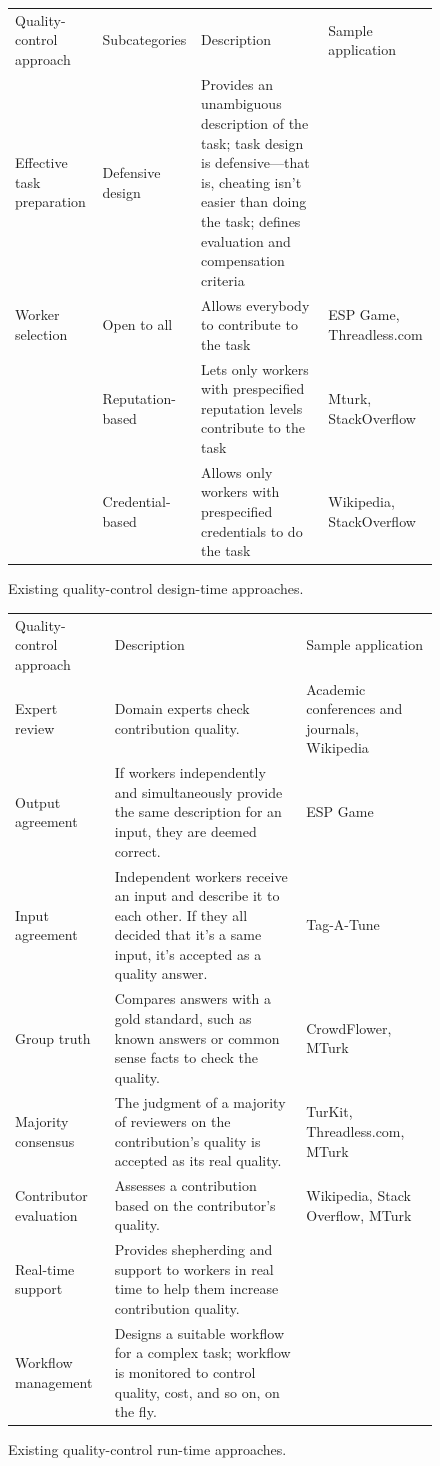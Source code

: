 \documentclass{sig-alternate-05-2015}
\begin{document}
	
	\begin{figure}
	\begin{tabularx}{\textwidth}{|XlXl|}
		\hline
		Quality-control approach & Subcategories & Description & Sample application\\
		Effective task preparation & Defensive design & Provides an unambiguous description of the task; task design is defensive---that is, cheating isn't easier than doing the task; defines evaluation and compensation criteria &  \\
		Worker selection & Open to all & Allows everybody to contribute to the task & ESP Game, Threadless.com \\
										  & Reputation-based & Lets only workers with prespecified reputation levels contribute to the task & Mturk, StackOverflow \\
										  & Credential-based & Allows only workers with prespecified credentials to do the task & Wikipedia, StackOverflow \\ \hline
	\end{tabularx}
	\caption{Existing quality-control design-time approaches.} %
	\label{fig-tbl1}
	\end{figure}
	
	\begin{figure}[!ht]

		\begin{tabularx}{1.1\textwidth}{|lXX|}
			\hline
			Quality-control approach & Description & Sample application \\
			Expert review & Domain experts check contribution quality. & Academic conferences and journals, Wikipedia \\
			Output agreement 		& If workers independently and simultaneously provide the same description for an input, they are deemed correct. & ESP Game \\
			Input agreement 		& Independent workers receive an input and describe it to each other.
			If they all decided that it's a same input, it's accepted as a quality answer. & Tag-A-Tune \\
			Group truth 			& Compares answers with a gold standard, such as known answers or common sense facts to check the quality. & CrowdFlower, MTurk \\
			Majority consensus 		& The judgment of a majority of reviewers on the contribution's quality is accepted as its real quality. & TurKit, Threadless.com, MTurk \\
			Contributor evaluation 	& Assesses a contribution based on the contributor's quality. & Wikipedia, Stack Overflow, MTurk \\
			Real-time support 		& Provides shepherding and support to workers in real time to help them increase contribution quality. & \\
			Workflow management 	& Designs a suitable workflow for a complex task; workflow is monitored to control quality, cost, and so on, on the fly. & \\
			 \hline
		\end{tabularx}
	\caption{Existing quality-control run-time approaches.}
	\label{fig-tbl2}
	\end{figure}
	
\end{document}

